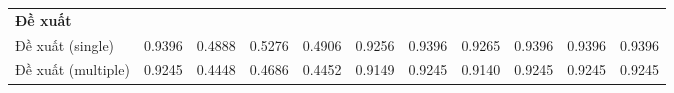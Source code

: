 \begin{table}[H]
{\begin{tabular}{lcccccccccc}
        \hline
        \multicolumn{11}{l}{\textbf{Đề xuất}} \\
        Đề xuất (single) & \cellcolor{green!60!black}0.9396 & \cellcolor{green!60!black}0.4888 & \cellcolor{green!60!black}0.5276 & \cellcolor{green!60!black}0.4906 & \cellcolor{green!90!black}0.9256 & \cellcolor{green!60!black}0.9396 & \cellcolor{green!90!black}0.9265 & \cellcolor{green!60!black}0.9396 & \cellcolor{green!60!black}0.9396 & \cellcolor{green!60!black}0.9396 \\
        Đề xuất (multiple) & \cellcolor{green!30}0.9245 & \cellcolor{green!90!black}0.4448 & \cellcolor{green!30}0.4686 & \cellcolor{green!90!black}0.4452 & \cellcolor{green!30}0.9149 & \cellcolor{green!30}0.9245 & \cellcolor{green!30}0.9140 & \cellcolor{green!30}0.9245 & \cellcolor{green!30}0.9245 & \cellcolor{green!30}0.9245 \\
        \hline
    \end{tabular}}
\end{table}

